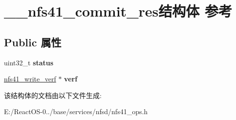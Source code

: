 \hypertarget{struct____nfs41__commit__res}{}\section{\+\_\+\+\_\+nfs41\+\_\+commit\+\_\+res结构体 参考}
\label{struct____nfs41__commit__res}
\subsection*{Public 属性}
\begin{DoxyCompactItemize}
\item 
\mbox{\label{struct____nfs41__commit__res_a210f4205f5f84d74e860c2c5161ff117}} 
uint32\+\_\+t {\bfseries status}
\item 
\mbox{\label{struct____nfs41__commit__res_a6c9df27802c774115bb895f7a4012145}} 
\hyperlink{struct____nfs41__write__verf}{nfs41\+\_\+write\+\_\+verf} $\ast$ {\bfseries verf}
\end{DoxyCompactItemize}


该结构体的文档由以下文件生成\+:\begin{DoxyCompactItemize}
\item 
E\+:/\+React\+O\+S-\/0../base/services/nfsd/nfs41\+\_\+ops.\+h\end{DoxyCompactItemize}
